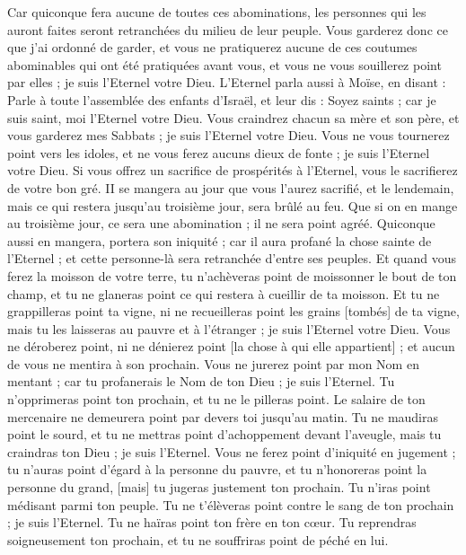 \begin{multicols}{2}
Car quiconque fera aucune de toutes ces abominations, les personnes qui les auront faites seront retranchées du milieu de leur peuple.
Vous garderez donc ce que j'ai ordonné de garder, et vous ne pratiquerez aucune de ces coutumes abominables qui ont été pratiquées avant vous, et vous ne vous souillerez point par elles ; je suis l'Eternel votre Dieu.
\VerseOne{}L'Eternel parla aussi à Moïse, en disant :
Parle à toute l'assemblée des enfants d'Israël, et leur dis : Soyez saints ; car je suis saint, moi l'Eternel votre Dieu.
Vous craindrez chacun sa mère et son père, et vous garderez mes Sabbats ; je suis l'Eternel votre Dieu.
Vous ne vous tournerez point vers les idoles, et ne vous ferez aucuns dieux de fonte ; je suis l'Eternel votre Dieu.
Si vous offrez un sacrifice de prospérités à l'Eternel, vous le sacrifierez de votre bon gré.
II se mangera au jour que vous l'aurez sacrifié, et le lendemain, mais ce qui restera jusqu'au troisième jour, sera brûlé au feu.
Que si on en mange au troisième jour, ce sera une abomination ; il ne sera point agréé.
Quiconque aussi en mangera, portera son iniquité ; car il aura profané la chose sainte de l'Eternel ; et cette personne-là sera retranchée d'entre ses peuples.
Et quand vous ferez la moisson de votre terre, tu n'achèveras point de moissonner le bout de ton champ, et tu ne glaneras point ce qui restera à cueillir de ta moisson.
Et tu ne grappilleras point ta vigne, ni ne recueilleras point les grains [tombés] de ta vigne, mais tu les laisseras au pauvre et à l'étranger ; je suis l'Eternel votre Dieu.
Vous ne déroberez point, ni ne dénierez point [la chose à qui elle appartient] ; et aucun de vous ne mentira à son prochain.
Vous ne jurerez point par mon Nom en mentant ; car tu profanerais le Nom de ton Dieu ; je suis l'Eternel.
Tu n'opprimeras point ton prochain, et tu ne le pilleras point. Le salaire de ton mercenaire ne demeurera point par devers toi jusqu'au matin.
Tu ne maudiras point le sourd, et tu ne mettras point d'achoppement devant l'aveugle, mais tu craindras ton Dieu ; je suis l'Eternel.
Vous ne ferez point d'iniquité en jugement ; tu n'auras point d'égard à la personne du pauvre, et tu n'honoreras point la personne du grand, [mais] tu jugeras justement ton prochain.
Tu n'iras point médisant parmi ton peuple. Tu ne t'élèveras point contre le sang de ton prochain ; je suis l'Eternel.
Tu ne haïras point ton frère en ton cœur. Tu reprendras soigneusement ton prochain, et tu ne souffriras point de péché en lui.

\end{multicols}
